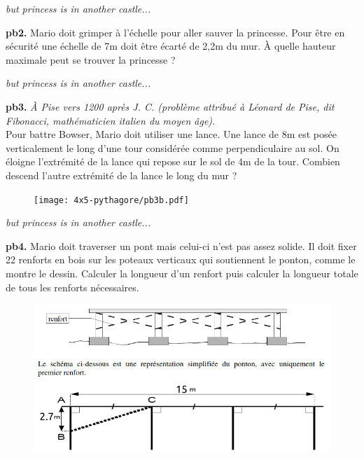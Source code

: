 \newpage

\textit{but princess is in another castle...}

\textbf{pb2.} Mario doit grimper à l'échelle pour aller sauver la princesse. Pour être en sécurité une échelle de 7m doit être écarté de 2,2m du mur. À quelle hauteur maximale peut se trouver la princesse ? \\
\Pointilles[5]

\begin{minipage}[t]{0.65\textwidth}
  \textit{but princess is in another castle...}

  \textbf{pb3.}  \textit{À Pise vers 1200 après J. C. (problème attribué à Léonard de Pise, dit Fibonacci, mathématicien italien   du moyen âge).} \\
  Pour battre Bowser, Mario doit utiliser une lance. Une lance de 8m est posée verticalement le long d’une tour considérée comme perpendiculaire au sol. On éloigne l’extrémité de la lance qui repose sur le sol de 4m de la tour. Combien descend l’autre extrémité de la lance le long du mur ?
  \Pointilles[6]
  \end{minipage}
  \begin{minipage}[t]{0.35\textwidth}
  \begin{figure}[H]
    \centering
    \texttt{[image: 4x5-pythagore/pb3b.pdf]}
  \end{figure}
\end{minipage}

\Pointilles[2]

\textit{but princess is in another castle...}

\textbf{pb4.}  Mario doit traverser un pont mais celui-ci n'est pas assez solide. Il doit fixer 22 renforts en bois sur les poteaux verticaux qui soutiennent le ponton, comme le montre le dessin. Calculer la longueur d'un renfort puis calculer la longueur totale de tous les renforts nécessaires. 
  
\begin{figure}[H]
  \centering
  \includegraphics[width=0.6\linewidth]{4x5-pythagore/pb4b.png}
\end{figure}
\Pointilles[10]





